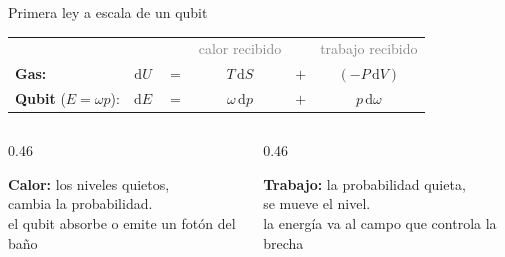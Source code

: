 \documentclass[10pt,aspectratio=169]{beamer}
\newcommand{\nota}[1]{{\small\color{gray}#1}}
\newcommand{\clave}[1]{{\color{usmBlue}\bfseries #1}}
\newcommand{\qubit}[3]{%
  \draw[nivel, usmBlue] (#1-0.55,0) -- (#1+0.55,0);
  \draw[nivel, usmRed] (#1-0.55,#2) -- (#1+0.55,#2);
  \ifnum#3=1 \fill[usmYellow] (#1,#2) circle (4.5pt); \else \fill[usmYellow] (#1,0) circle (4.5pt); \fi
}
\begin{document}
\begin{frame}{Primera ley a escala de un qubit}
\begin{center}
\renewcommand{\arraystretch}{1.5}
\begin{tabular}{lccccc}
 & & & \textcolor{gray}{\small calor recibido} & & \textcolor{gray}{\small trabajo recibido}\\
\textbf{Gas:} & $\mathrm{d}U$ & $=$ & $T\,\mathrm{d}S$ & $+$ & $(-P\,\mathrm{d}V)$\\
\textbf{Qubit} \small($E=\omega p$): & {\Large$\mathrm{d}E$} & {\Large$=$} & {\Large$\omega\,\mathrm{d}p$} & {\Large$+$} & {\Large$p\,\mathrm{d}\omega$}
\end{tabular}
\end{center}
\vspace{0.1em}
\begin{columns}[t]
\begin{column}{0.46\textwidth}\centering

  \vspace{0.4em}
  \clave{Calor:} los niveles quietos,\\ cambia la probabilidad.\\
  \nota{el qubit absorbe o emite un fotón del baño}
\end{column}
\begin{column}{0.46\textwidth}\centering

  \vspace{0.4em}
  \clave{Trabajo:} la probabilidad quieta,\\ se mueve el nivel.\\
  \nota{la energía va al campo que controla la brecha}
\end{column}
\end{columns}
\end{frame}
\end{document}
